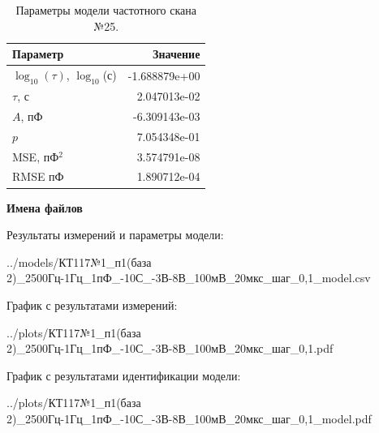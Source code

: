 \begin{table}[!ht]
    \centering
    \caption{Параметры модели частотного скана №25.}
    \begin{tabular}{|l|r|}
        \hline
        Параметр                                       & Значение                  \\ \hline
        $\log_{10}(\tau)$, $\log_{10}$(с)              & -1.688879e+00             \\ \hline
        $\tau$, с                                      & 2.047013e-02              \\ \hline
        $A$, пФ                                        & -6.309143e-03             \\ \hline
        $p$                                            & 7.054348e-01              \\ \hline
        MSE, пФ$^2$                                    & 3.574791e-08              \\ \hline
        RMSE пФ                                        & 1.890712e-04              \\ \hline
    \end{tabular}
    \label{table:frequency_scan_model_25}
\end{table}

\textbf{Имена файлов}

Результаты измерений и параметры модели:

\scriptsize../models/КТ117№1\_п1(база 2)\_2500Гц-1Гц\_1пФ\_-10С\_-3В-8В\_100мВ\_20мкс\_шаг\_0,1\_model.csv
\normalsize

График с результатами измерений:

\scriptsize../plots/КТ117№1\_п1(база 2)\_2500Гц-1Гц\_1пФ\_-10С\_-3В-8В\_100мВ\_20мкс\_шаг\_0,1.pdf
\normalsize

График с результатами идентификации модели:

\scriptsize../plots/КТ117№1\_п1(база 2)\_2500Гц-1Гц\_1пФ\_-10С\_-3В-8В\_100мВ\_20мкс\_шаг\_0,1\_model.pdf
\normalsize

